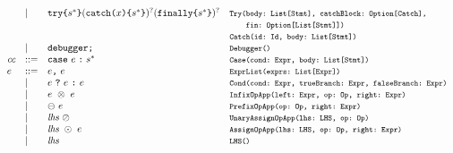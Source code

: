 \[\begin{array}{llll}
& \mid &
{\tt try} \verb+{+\stmt^*\verb+}+ ({\tt catch} \verb+(+\myid\verb+)+ \verb+{+\stmt^*\verb+}+)^? ({\tt finally} \verb+{+\stmt^*\verb+}+)^?
& \mtt{Try(body:~List[Stmt], catchBlock:~Option[Catch],}\\
&&& \mtt{\phantom{Try(}fin:~Option[List[Stmt]])}\\
&&& \mtt{Catch(id:~Id, body:~List[Stmt])}\\
& \mid & {\tt debugger} \verb+;+ & \mtt{Debugger()}\\

\cc &::=& {\tt case} \ \expr \; \verb+:+ \; \stmt^{*} & \mtt{Case(cond:~Expr, body:~List[Stmt])}\\

\expr &::=& \expr\verb+,+ \ \expr & \mtt{ExprList(exprs:~List[Expr])}\\
  &\mid& \expr \ \verb+?+ \ \expr \ \verb+:+ \ \expr & \mtt{Cond(cond:~Expr, trueBranch:~Expr, falseBranch:~Expr)}\\
  &\mid& \expr \ \inop \ \expr & \mtt{InfixOpApp(left:~Expr, op:~Op, right:~Expr)}\\
  &\mid& \preop \ \expr & \mtt{PrefixOpApp(op:~Op, right:~Expr)}\\

  &\mid& \lhs \ \postop & \mtt{UnaryAssignOpApp(lhs:~LHS, op:~Op)}\\
  &\mid& \lhs \ \aop \ \expr & \mtt{AssignOpApp(lhs:~LHS, op:~Op, right:~Expr)}\\
  &\mid& \lhs & \mtt{LHS()}\\
\end{array}
\]

